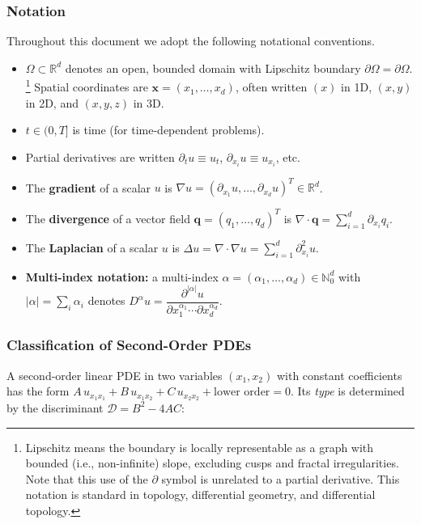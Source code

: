 \documentclass[11pt]{article}
\newcommand{\R}{\mathbb{R}}
\newcommand{\domain}{\Omega}
\newcommand{\boundary}{\partial\Omega}
\begin{document}
\subsubsection{Notation}

Throughout this document we adopt the following notational conventions.

\begin{itemize}
  \item $\domain \subset \R^d$ denotes an open, bounded domain with
    Lipschitz boundary $\boundary = \partial\domain$.%
    \footnote{%
    Lipschitz means the boundary is locally representable as a graph with bounded (i.e., non-infinite) slope, excluding cusps and fractal irregularities.
    Note that this use of the $\partial$ symbol is unrelated to a partial derivative. This notation is standard in topology, differential geometry, and differential topology.}
    Spatial coordinates are $\mathbf{x} = (x_1,\ldots,x_d)$, often
    written $(x)$ in 1D, $(x,y)$ in 2D, and $(x,y,z)$ in 3D.
  \item $t \in (0,T]$ is time (for time-dependent problems).
  \item Partial derivatives are written $\partial_t u \equiv u_t$,
    $\partial_{x_i} u \equiv u_{x_i}$, etc.
  \item The \textbf{gradient} of a scalar $u$ is
    $\nabla u = (\partial_{x_1}u, \ldots, \partial_{x_d}u)^T \in \R^d$.
  \item The \textbf{divergence} of a vector field
    $\mathbf{q} = (q_1,\ldots,q_d)^T$ is
    $\nabla\cdot\mathbf{q} = \sum_{i=1}^d \partial_{x_i} q_i$.
  \item The \textbf{Laplacian} of a scalar $u$ is
    $\Delta u = \nabla\cdot\nabla u = \sum_{i=1}^d \partial_{x_i}^2 u$.
  \item \textbf{Multi-index notation:} a multi-index $\alpha =
    (\alpha_1,\ldots,\alpha_d) \in \mathbb{N}_0^d$ with
    $|\alpha| = \sum_i \alpha_i$ denotes
    $D^\alpha u = \dfrac{\partial^{|\alpha|} u}{\partial x_1^{\alpha_1}
    \cdots \partial x_d^{\alpha_d}}$.
\end{itemize}

\subsubsection{Classification of Second-Order PDEs}

A second-order linear PDE in two variables $(x_1, x_2)$ with constant
coefficients has the form
$A\,u_{x_1 x_1} + B\,u_{x_1 x_2} + C\,u_{x_2 x_2} + \text{lower order} = 0$.
Its \emph{type} is determined by the discriminant $\mathcal{D} = B^2 - 4AC$:
\end{document}
